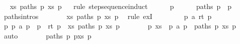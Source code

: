 \begin{isabellebody}
\ \isamarkupfalse%
\ {\isachardoublequoteopen}{\isasymexists}xs{\isachardot}{\kern0pt}\ paths\ p\ xs\ p{\isacharprime}{\kern0pt}{\isachardoublequoteclose}\isanewline
\ \ \isamarkupfalse%
{\isacharparenleft}{\kern0pt}rule\ step{\isacharunderscore}{\kern0pt}sequence{\isachardot}{\kern0pt}induct{\isacharparenright}{\kern0pt}\isanewline
\ \ \ \ \isamarkupfalse%
\ p\isanewline
\ \ \ \ \isamarkupfalse%
\ {\isachardoublequoteopen}paths\ p\ {\isacharbrackleft}{\kern0pt}{\isacharbrackright}{\kern0pt}\ p{\isachardoublequoteclose}\ \isamarkupfalse%
\ paths{\isachardot}{\kern0pt}intros{\isacharparenleft}{\kern0pt}{}{\isacharparenright}{\kern0pt}\isacommand{{\isachardot}{\kern0pt}}\isamarkupfalse%
\isanewline
\ \ \ \ \isamarkupfalse%
\ \isamarkupfalse%
\ {\isachardoublequoteopen}{\isasymexists}xs{\isachardot}{\kern0pt}\ paths\ p\ xs\ p{\isachardoublequoteclose}\ \isamarkupfalse%
\ {\isacharparenleft}{\kern0pt}rule\ exI{\isacharparenright}{\kern0pt}\isanewline
\ \ \isamarkupfalse%
\isanewline
\ \ \ \ \isamarkupfalse%
\ p\ a\ rt\ p{\isacharprime}{\kern0pt}{\isacharprime}{\kern0pt}\isanewline
\ \ \ \ \isamarkupfalse%
\ {\isachardoublequoteopen}{\isasymexists}p{\isacharprime}{\kern0pt}{\isachardot}{\kern0pt}\ p\ {\isasymmapsto}a\ p{\isacharprime}{\kern0pt}\ {\isasymand}\ p{\isacharprime}{\kern0pt}\ {\isasymmapsto}{\isachardollar}{\kern0pt}\ rt\ p{\isacharprime}{\kern0pt}{\isacharprime}{\kern0pt}\ {\isasymand}\ {\isacharparenleft}{\kern0pt}{\isasymexists}xs{\isachardot}{\kern0pt}\ paths\ p{\isacharprime}{\kern0pt}\ xs\ p{\isacharprime}{\kern0pt}{\isacharprime}{\kern0pt}{\isacharparenright}{\kern0pt}{\isachardoublequoteclose}\isanewline
\ \ \ \ \isamarkupfalse%
\ \isamarkupfalse%
\ p{\isacharprime}{\kern0pt}\ xs\ \ {\isachardoublequoteopen}p\ {\isasymmapsto}a\ p{\isacharprime}{\kern0pt}{\isachardoublequoteclose}\ \ {\isachardoublequoteopen}paths\ p{\isacharprime}{\kern0pt}\ xs\ p{\isacharprime}{\kern0pt}{\isacharprime}{\kern0pt}{\isachardoublequoteclose}\ \isamarkupfalse%
\ auto\isanewline
\ \ \ \ \isamarkupfalse%
\ \isamarkupfalse%
\ {\isachardoublequoteopen}paths\ p\ {\isacharparenleft}{\kern0pt}p{\isacharprime}{\kern0pt}{\isacharhash}{\kern0pt}xs{\isacharparenright}{\kern0pt}\ p{\isacharprime}{\kern0pt}{\isacharprime}{\kern0pt}{\isachardoublequoteclose}\ \isamarkupfalse%

\end{isabellebody}
